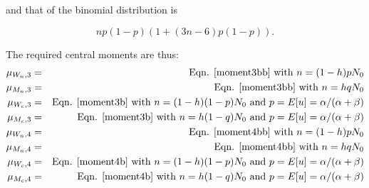 \documentclass{article}
\begin{document}
and that of the binomial distribution is

\begin{equation}
  np(1-p)(1+(3n-6)p(1-p)). \label{moment4b}
\end{equation}

The required central moments are thus:
\begin{eqnarray}
  \mu_{W_n,3} & = & \text{Eqn. \ref{moment3bb} with $n = (1-h)p N_0$} \\
  \mu_{M_n,3} & = & \text{Eqn. \ref{moment3bb} with $n = h q N_0$} \\
  \mu_{W_c,3} & = & \text{Eqn. \ref{moment3b} with $n = (1-h)(1-p) N_0$ and $p = E[u] = \alpha/(\alpha+\beta)$} \\
  \mu_{M_c,3} & = & \text{Eqn. \ref{moment3b} with $n = h (1-q) N_0$ and $p = E[u] = \alpha/(\alpha+\beta)$} \\
  \mu_{W_n,4} & = & \text{Eqn. \ref{moment4bb} with $n = (1-h)p N_0$} \\
  \mu_{M_n,4} & = & \text{Eqn. \ref{moment4bb} with $n = h q N_0$} \\
  \mu_{W_c,4} & = & \text{Eqn. \ref{moment4b} with $n = (1-h)(1-p) N_0$ and $p = E[u] = \alpha/(\alpha+\beta)$} \\
  \mu_{M_c,4} & = & \text{Eqn. \ref{moment4b} with $n = h (1-q) N_0$ and $p = E[u] = \alpha/(\alpha+\beta)$} \\
\end{eqnarray}

\end{document}
